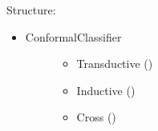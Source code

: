 \documentclass[letterpaper,10pt,english]{sphinxmanual}
\begin{document}
Structure:
\begin{itemize}
\item {} \begin{description}
\item[{ConformalClassifier}] \leavevmode\begin{itemize}
\item {} 
Transductive ({\hyperref[cp.classification:cp.classification.TransductiveClassifier]{}})

\item {} 
Inductive ({\hyperref[cp.classification:cp.classification.InductiveClassifier]{}})

\item {} 
Cross ({\hyperref[cp.classification:cp.classification.CrossClassifier]{}})

\end{itemize}

\end{description}

\end{itemize}
\end{document}

